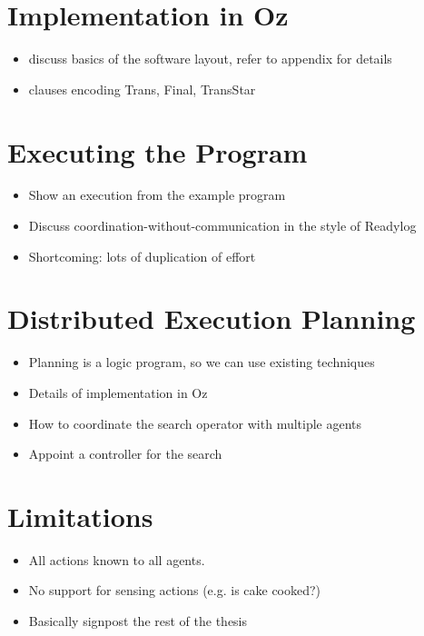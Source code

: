 \section{Implementation in Oz}
\begin{itemize}
\item discuss basics of the software layout, refer to appendix for details
\item clauses encoding Trans, Final, TransStar
\end{itemize}

\section{Executing the Program}
\begin{itemize}
\item Show an execution from the example program
\item Discuss coordination-without-communication in the style of Readylog
\item Shortcoming: lots of duplication of effort
\end{itemize}

\section{Distributed Execution Planning}
\begin{itemize}
\item Planning is a logic program, so we can use existing techniques
\item Details of implementation in Oz
\item How to coordinate the search operator with multiple agents
  \item Appoint a controller for the search
\end{itemize}

\section{Limitations}
\begin{itemize}
\item All actions known to all agents. 
\item No support for sensing actions (e.g. is cake cooked?)
\item Basically signpost the rest of the thesis
\end{itemize}

